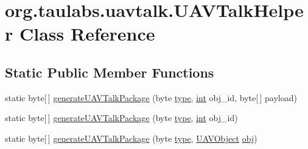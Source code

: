 \hypertarget{classorg_1_1taulabs_1_1uavtalk_1_1_u_a_v_talk_helper}{\section{org.\-taulabs.\-uavtalk.\-U\-A\-V\-Talk\-Helper Class Reference}
\label{classorg_1_1taulabs_1_1uavtalk_1_1_u_a_v_talk_helper}
}
\subsection*{Static Public Member Functions}
\begin{DoxyCompactItemize}
\item 
static byte\mbox{[}$\,$\mbox{]} \hyperlink{classorg_1_1taulabs_1_1uavtalk_1_1_u_a_v_talk_helper_afb6d3dab28b1ad2775252c7965dfde46}{generate\-U\-A\-V\-Talk\-Package} (byte \hyperlink{glext_8h_a7d05960f4f1c1b11f3177dc963a45d86}{type}, \hyperlink{ioapi_8h_a787fa3cf048117ba7123753c1e74fcd6}{int} obj\-\_\-id, byte\mbox{[}$\,$\mbox{]} payload)
\item 
static byte\mbox{[}$\,$\mbox{]} \hyperlink{classorg_1_1taulabs_1_1uavtalk_1_1_u_a_v_talk_helper_a32d83d07f5f1c0768d424c09d4ad41d4}{generate\-U\-A\-V\-Talk\-Package} (byte \hyperlink{glext_8h_a7d05960f4f1c1b11f3177dc963a45d86}{type}, \hyperlink{ioapi_8h_a787fa3cf048117ba7123753c1e74fcd6}{int} obj\-\_\-id)
\item 
static byte\mbox{[}$\,$\mbox{]} \hyperlink{classorg_1_1taulabs_1_1uavtalk_1_1_u_a_v_talk_helper_a83c7df5977d039ac81d0b807bb8419c4}{generate\-U\-A\-V\-Talk\-Package} (byte \hyperlink{glext_8h_a7d05960f4f1c1b11f3177dc963a45d86}{type}, \hyperlink{classorg_1_1taulabs_1_1uavtalk_1_1_u_a_v_object}{U\-A\-V\-Object} \hyperlink{glext_8h_a0c0d4701a6c89f4f7f0640715d27ab26}{obj})
\end{DoxyCompactItemize}

